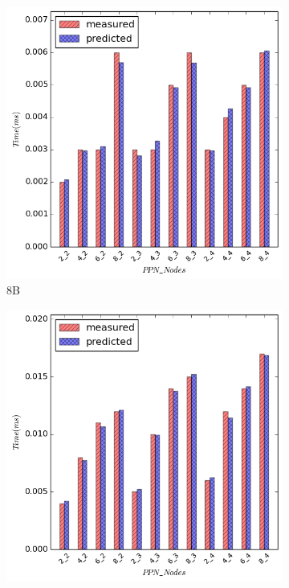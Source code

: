 \begin{figure}[H]
    \centering
    \captionsetup{justification=centering,margin=0cm,font=footnotesize}
    \begin{subfigure}[b]{0.4\textwidth}
        \includegraphics[width=\textwidth]{./images/broadcast_NUMA/bcast_8.png}
        \caption{8B}
    \end{subfigure}
    \quad 
        \begin{subfigure}[b]{0.4\textwidth}
        \includegraphics[width=\textwidth]{./images/broadcast_NUMA/bcast_1024.png}

\end{subfigure}
\end{figure}
